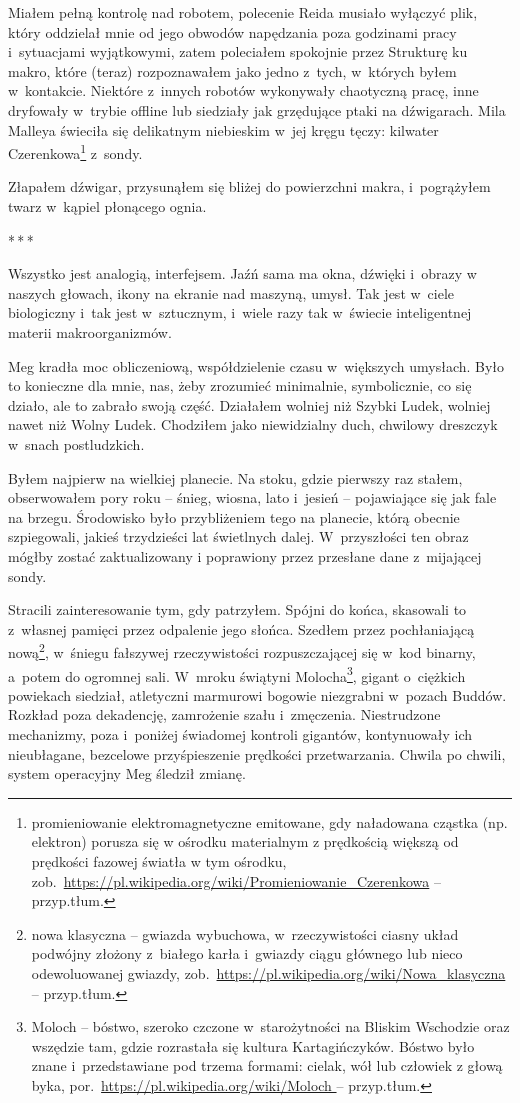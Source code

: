 \documentclass[oneside,polish,11pt,sfheadings]{mwbk}
\newcommand{\threeast}{\bigskip\par\centerline{*\,*\,*}\medskip\par}
\begin{document}
Miałem pełną kontrolę nad robotem, polecenie Reida musiało wyłączyć
plik, który oddzielał mnie od jego obwodów napędzania poza godzinami
pracy i~sytuacjami wyjątkowymi, zatem poleciałem spokojnie przez
Strukturę ku makro, które (teraz) rozpoznawałem jako jedno z~tych, w~których byłem w~kontakcie. Niektóre z~innych robotów wykonywały
chaotyczną pracę, inne dryfowały w~trybie offline lub siedziały jak
grzędujące ptaki na dźwigarach. Mila Malleya świeciła się delikatnym
niebieskim w~jej kręgu tęczy: kilwater Czerenkowa\footnote{ promieniowanie elektromagnetyczne emitowane, gdy naładowana cząstka (np. elektron) porusza się w ośrodku materialnym z prędkością większą od prędkości fazowej światła w tym ośrodku, zob.~\url{https://pl.wikipedia.org/wiki/Promieniowanie_Czerenkowa} -- przyp.tłum.} z~sondy. 

Złapałem dźwigar, przysunąłem się bliżej do powierzchni makra, i~pogrążyłem twarz w~kąpiel płonącego ognia.

\threeast

Wszystko jest analogią, interfejsem. Jaźń sama ma okna, dźwięki i~obrazy
w naszych głowach, ikony na ekranie nad maszyną, umysł. Tak jest w~ciele
biologiczny i~tak jest w~sztucznym, i~wiele razy tak w~świecie
inteligentnej materii makroorganizmów.

Meg kradła moc obliczeniową, współdzielenie czasu w~większych umysłach.
Było to konieczne dla mnie, nas, żeby zrozumieć minimalnie,
symbolicznie, co się działo, ale to zabrało swoją część. Działałem
wolniej niż Szybki Ludek, wolniej nawet niż Wolny Ludek. Chodziłem jako
niewidzialny duch, chwilowy dreszczyk w~snach postludzkich.

Byłem najpierw na wielkiej planecie. Na stoku, gdzie pierwszy raz
stałem, obserwowałem pory roku -- śnieg, wiosna, lato i~jesień -- pojawiające się jak fale na brzegu. Środowisko było przybliżeniem tego
na planecie, którą obecnie szpiegowali, jakieś trzydzieści lat
świetlnych dalej. W~przyszłości ten obraz mógłby zostać zaktualizowany
i poprawiony przez przesłane dane z~mijającej sondy.

Stracili zainteresowanie tym, gdy patrzyłem. Spójni do końca, skasowali
to z~własnej pamięci przez odpalenie jego słońca. Szedłem przez
pochłaniającą nową\footnote{nowa klasyczna -- gwiazda wybuchowa, w~rzeczywistości ciasny układ podwójny złożony z~białego karła i~gwiazdy
ciągu głównego lub nieco odewoluowanej gwiazdy,
zob.~\url{https://pl.wikipedia.org/wiki/Nowa_klasyczna } -- przyp.tłum.}, w~śniegu fałszywej rzeczywistości rozpuszczającej się w~kod binarny, a~potem do ogromnej sali. W~mroku świątyni Molocha\footnote{Moloch -- bóstwo, szeroko czczone w~starożytności na Bliskim Wschodzie
oraz wszędzie tam, gdzie rozrastała się kultura Kartagińczyków. Bóstwo
było znane i~przedstawiane pod trzema formami: cielak, wół lub człowiek
z głową byka, por.~\url{https://pl.wikipedia.org/wiki/Moloch
} -- przyp.tłum.}, gigant o~ciężkich powiekach siedział, atletyczni
marmurowi bogowie niezgrabni w~pozach Buddów. Rozkład poza dekadencję,
zamrożenie szału i~zmęczenia. Niestrudzone mechanizmy, poza i~poniżej
świadomej kontroli gigantów, kontynuowały ich nieubłagane, bezcelowe
przyśpieszenie prędkości przetwarzania. Chwila po chwili, system
operacyjny Meg śledził zmianę.
\end{document}

